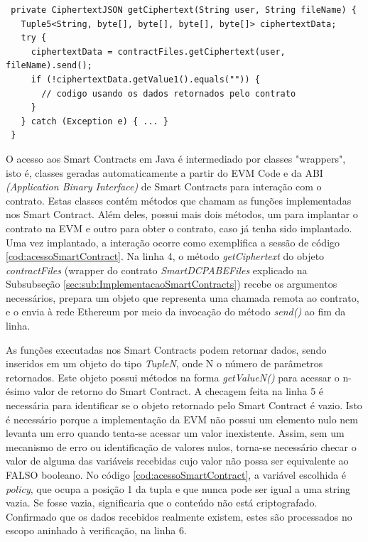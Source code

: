 \documentclass[a4paper,11pt]{article}
\begin{document}


\begin{lstlisting}
 private CiphertextJSON getCiphertext(String user, String fileName) {
   Tuple5<String, byte[], byte[], byte[], byte[]> ciphertextData;
   try {
     ciphertextData = contractFiles.getCiphertext(user, fileName).send();
     if (!ciphertextData.getValue1().equals("")) {
       // codigo usando os dados retornados pelo contrato
     }
   } catch (Exception e) { ... }
 }
\end{lstlisting}

O acesso aos Smart Contracts em Java é intermediado por classes "wrappers", isto é, classes geradas automaticamente a partir do EVM Code e da ABI \emph{(Application Binary Interface)} de Smart Contracts para interação com o contrato.
Estas classes contém métodos que chamam as funções implementadas nos Smart Contract. Além deles, possui mais dois métodos, um para implantar o contrato na EVM e outro para obter o contrato, caso já tenha sido implantado.
Uma vez implantado, a interação ocorre como exemplifica a sessão de código \ref{cod:acessoSmartContract}.
Na linha 4, o método \emph{getCiphertext} do objeto \emph{contractFiles} (wrapper do contrato \emph{SmartDCPABEFiles} explicado na Subsubseção \ref{sec:sub:ImplementacaoSmartContracts}) recebe os argumentos necessários, prepara um objeto que representa uma chamada remota ao contrato, e o envia à rede Ethereum por meio da invocação do método \emph{send()} ao fim da linha.

As funções executadas nos Smart Contracts podem retornar dados, sendo inseridos em um objeto do tipo \emph{TupleN}, onde N o número de parâmetros retornados. Este objeto possui métodos na forma \emph{getValueN()} para acessar o n-ésimo valor de retorno do Smart Contract.
A checagem feita na linha 5 é necessária para identificar se o objeto retornado pelo Smart Contract é vazio.
Isto é necessário porque a implementação da EVM não possui um elemento nulo nem levanta um erro quando tenta-se acessar um valor inexistente.
Assim, sem um mecanismo de erro ou identificação de valores nulos, torna-se necessário checar o valor de alguma das variáveis recebidas cujo valor não possa ser equivalente ao FALSO booleano.
No código \ref{cod:acessoSmartContract}, a variável escolhida é \emph{policy}, que ocupa a posição 1 da tupla e que nunca pode ser igual a uma string vazia. Se fosse vazia, significaria que o conteúdo não está criptografado. %
Confirmado que os dados recebidos realmente existem, estes são processados no escopo aninhado à verificação, na linha 6.
\end{document}
